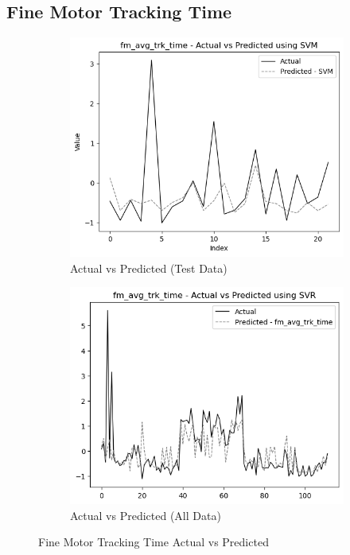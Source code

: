 \subsection*{Fine Motor Tracking Time}

\begin{figure}[htbp]
    \centering
    \begin{subfigure}[b]{0.49\textwidth}
        \centering
        \includegraphics[width=\textwidth]{images/regressionCharts/test_data_fine_motor_tracking_time.png}
        \caption{Actual vs Predicted (Test Data)}
        \label{fig:actual_vs_predicted_fm_avg_trk_time_test}
    \end{subfigure}\hfill
    \begin{subfigure}[b]{0.49\textwidth}
        \centering
        \includegraphics[width=\textwidth]{images/regressionCharts/all_data_fine_motor_tracking_time.png}
        \caption{Actual vs Predicted (All Data)}
        \label{fig:actual_vs_predicted_fm_avg_trk_time_all_data}
    \end{subfigure}
    \caption{Fine Motor Tracking Time Actual vs Predicted}
    \label{fig:fine_motor_tracking_time_comparison}
\end{figure}

